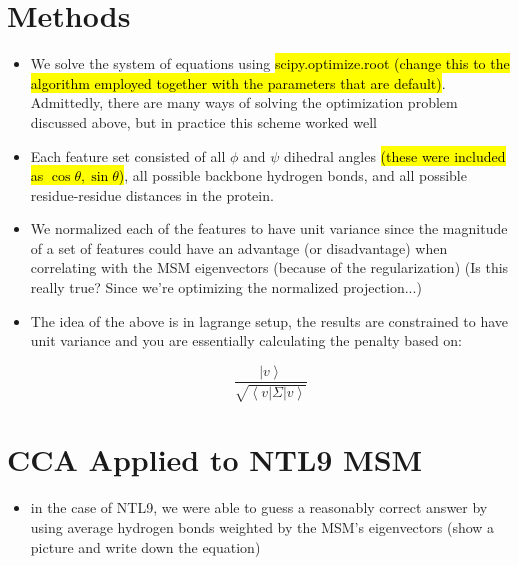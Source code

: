 \documentclass[onecolumn,floatfix,nofootinbib,aps,notitlepage]{revtex4-1}
\newcommand{\bra}[1]{\ensuremath{\left\langle#1\right|}}
\newcommand{\ket}[1]{\ensuremath{\left|#1\right\rangle}}
\begin{document}
\section{Methods}
\begin{itemize}
\item We solve the system of equations using \hl{scipy.optimize.root (change this to the algorithm employed together with the parameters that are default)}. Admittedly, there are many ways of solving the optimization problem discussed above, but in practice this scheme worked well
\item Each feature set consisted of all $\phi$ and $\psi$ dihedral angles \hl{(these were included as $\cos\theta, \sin\theta$)}, all possible backbone hydrogen bonds, and all possible residue-residue distances in the protein.
\item We normalized each of the features to have unit variance since the magnitude of a set of features could have an advantage (or disadvantage) when correlating with the MSM eigenvectors (because of the regularization) (Is this really true? Since we're optimizing the normalized projection...)
\item The idea of the above is in lagrange setup, the results are constrained to have unit variance and you are essentially calculating the penalty based on:

$$ \frac{\ket{v}}{\sqrt{\bra{v}\Sigma\ket{v}}} $$
\end{itemize}

\section{CCA Applied to NTL9 MSM}
\begin{itemize}
\item in the case of NTL9, we were able to guess a reasonably correct answer by using average hydrogen bonds weighted by the MSM's eigenvectors (show a picture and write down the equation)
\end{itemize}
 
\end{document}
